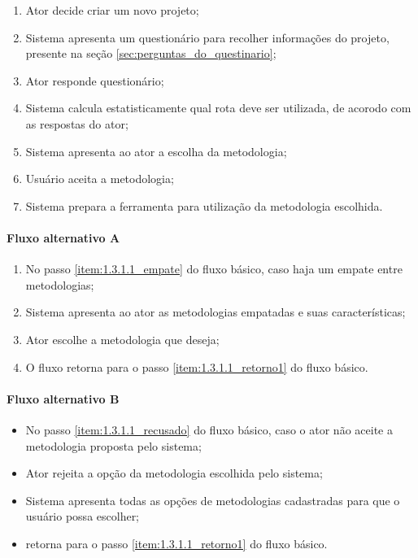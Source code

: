 	\begin{enumerate}
		\item Ator decide criar um novo projeto;
		\item Sistema apresenta um questionário para recolher informações do projeto, presente na seção \ref{sec:perguntas_do_questinario};
		\item Ator responde questionário;
		\item Sistema calcula estatisticamente qual rota deve ser utilizada, de acorodo com as respostas do ator;
			\label{item:1.3.1.1_empate}
		\item Sistema apresenta ao ator a escolha da metodologia;
		\item Usuário aceita a metodologia;
			\label{item:1.3.1.1_recusado}
		\item Sistema prepara a ferramenta para utilização da metodologia escolhida.
			\label{item:1.3.1.1_retorno1}
	\end{enumerate}

\paragraph{Fluxo alternativo A}

	\begin{enumerate}
		\item No passo \ref{item:1.3.1.1_empate} do fluxo básico, caso haja um empate entre metodologias;
		\item Sistema apresenta ao ator as metodologias empatadas e suas características;
		\item Ator escolhe a metodologia que deseja;
		\item O fluxo retorna para o passo \ref{item:1.3.1.1_retorno1} do fluxo básico.
	\end{enumerate}

\paragraph{Fluxo alternativo B}

	\begin{itemize}
		\item No passo \ref{item:1.3.1.1_recusado} do fluxo básico, caso o ator não aceite a metodologia proposta pelo sistema;
		\item Ator rejeita a opção da metodologia escolhida pelo sistema;
		\item Sistema apresenta todas as opções de metodologias cadastradas para que o usuário possa escolher;
		\item retorna para o passo \ref{item:1.3.1.1_retorno1} do fluxo básico.
	\end{itemize}

